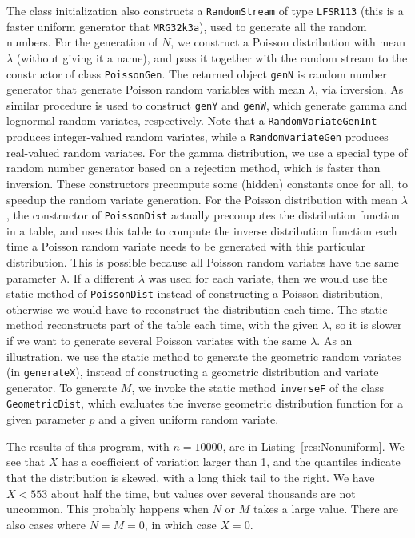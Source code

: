 The class initialization also constructs a \texttt{RandomStream} of type
\texttt{LFSR113} (this is a faster uniform generator that \texttt{MRG32k3a}),
used to generate all the random numbers.
For the generation of $N$, we construct a Poisson distribution
with mean $\lambda$ (without giving it a name),
and pass it together with the random stream to
the constructor of class \texttt{PoissonGen}.
The returned object \texttt{genN} is random number generator that generate
Poisson random variables with mean $\lambda$, via inversion.
As similar procedure is used to construct \texttt{genY} and \texttt{genW},
which generate gamma and lognormal random variates, respectively.
Note that a \texttt{RandomVariateGenInt} produces integer-valued random variates,
while a \texttt{RandomVariateGen} produces real-valued random variates.
For the gamma distribution, we use a special type of random number generator
based on a rejection method, which is faster than inversion.
These constructors precompute some (hidden) constants once for all,
to speedup the random variate generation.
For the Poisson distribution with mean $\lambda$, the constructor of \texttt{PoissonDist}
actually precomputes the distribution function in a table, and uses
this table to compute the inverse distribution function each time a Poisson
random variate needs to be generated with this particular distribution.
This is possible because all Poisson random variates have the same parameter $\lambda$.
If a different $\lambda$ was used for each variate, then we would use
the static method of \texttt{PoissonDist} instead of constructing a Poisson distribution,
otherwise we would have to reconstruct the distribution each time.
The static method reconstructs part of the table each time, with the given $\lambda$,
so it is slower if we want to generate several Poisson variates with the same $\lambda$.
As an illustration, we use the static method to generate the geometric random variates
(in \texttt{generateX}), instead of constructing a geometric distribution and variate generator.
To generate $M$, we invoke the static method \texttt{inverseF} of the class
\texttt{GeometricDist}, which evaluates the inverse geometric distribution function
for a given parameter $p$ and a given uniform random variate.

The results of this program, with $n = 10000$, are in Listing~\ref{res:Nonuniform}.
We see that $X$ has a coefficient of variation larger than 1,
and the quantiles indicate that the distribution is skewed,
with a long thick tail to the right.
We have $X < 553$ about half the time, but values over several thousands are not uncommon.
This probably happens when $N$ or $M$ takes a large value.
There are also cases where $N=M=0$, in which case $X=0$.



